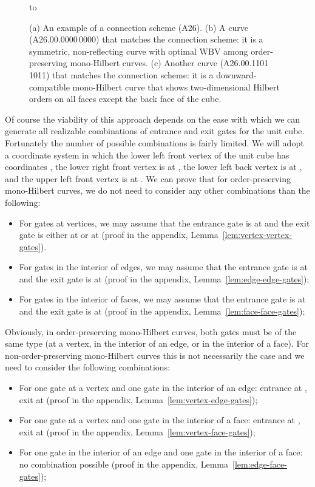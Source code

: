 \documentclass[11pt,a4paper]{article}
\def\WBV{\ensuremath{\mathrm{WBV}}\xspace}
\begin{document}
\begin{figure}
\centering
\hbox to 
\caption{(a) An example of a connection scheme (A26). (b)  A curve (A26.00.0000\,0000) that matches the connection scheme: it is a symmetric, non-reflecting curve with optimal \WBV among order-preserving mono-Hilbert curves. (c) Another curve (A26.00.1101\,1011) that matches the connection scheme: it is a downward-compatible mono-Hilbert curve that shows two-dimensional Hilbert orders on all faces except the back face of the cube.}
\label{fig:scheme-example}\label{fig:A26-curves}
\end{figure}

Of course the viability of this approach depends on the ease with which we can generate all realizable combinations of entrance and exit gates for the unit cube. Fortunately the number of possible combinations is fairly limited. We will adopt a coordinate system in which the lower left front vertex of the unit cube has coordinates , the lower right front vertex is at , the lower left back vertex is at , and the upper left front vertex is at . We can prove that for order-preserving mono-Hilbert curves, we do not need to consider any other combinations than the following:\begin{itemize}
\item For gates at vertices, we may assume that the entrance gate is at  and the exit gate is either at  or at  (proof in the appendix, Lemma~\ref{lem:vertex-vertex-gates}).
\item For gates in the interior of edges, we may assume that the entrance gate is at  and the exit gate is at  (proof in the appendix, Lemma~\ref{lem:edge-edge-gates});
\item For gates in the interior of faces, we may assume that the entrance gate is at  and the exit gate is at   (proof in the appendix, Lemma~\ref{lem:face-face-gates});
\end{itemize}
Obviously, in order-preserving mono-Hilbert curves, both gates must be of the same type (at a vertex, in the interior of an edge, or in the interior of a face). For non-order-preserving mono-Hilbert curves this is not necessarily the case and we need to consider the following combinations:\begin{itemize}
\item For one gate at a vertex and one gate in the interior of an edge: entrance at , exit at  (proof in the appendix, Lemma~\ref{lem:vertex-edge-gates});
\item For one gate at a vertex and one gate in the interior of a face: entrance at , exit at  (proof in the appendix, Lemma~\ref{lem:vertex-face-gates});
\item For one gate in the interior of an edge and one gate in the interior of a face: no combination possible (proof in the appendix, Lemma~\ref{lem:edge-face-gates});
\end{itemize}
\end{document}
